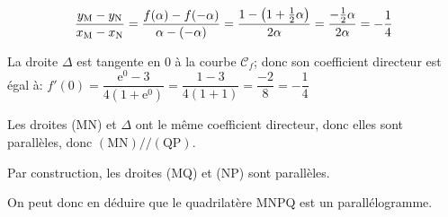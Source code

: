 \documentclass[10pt]{article}
\providecommand{\e}{{\mathrm{e}}}
\begin{document}
\begin{enumerate}
\begin{enumerate}
\[\dfrac{y_{\text M} - y_{\text N}}{x_{\text M} - x_{\text N}}
= \dfrac{f(\alpha) - f(-\alpha)}{\alpha-(-\alpha)}
= \dfrac{1-\left (1+\frac{1}{2}\alpha\right )}{2\alpha}
= \dfrac{-\frac{1}{2}\alpha}{2\alpha}
= -\dfrac{1}{4}\]

La droite $\Delta$ est tangente en 0 à la courbe $\mathcal{C}_f$; donc son coefficient directeur est égal à:
$f'(0)=\dfrac{\e^{0}-3}{4\left (1+\e^{0}\right )}
= \dfrac{1-3}{4\left (1+1\right )}
= \dfrac{-2}{8}
= -\dfrac{1}{4}$

Les droites (MN) et $\Delta$ ont le même coefficient directeur, donc elles sont parallèles, donc $(\text{MN}) /\!/ (\text{QP})$.

Par construction, les droites (MQ) et (NP) sont parallèles.

On peut donc en déduire que le quadrilatère MNPQ est un parallélogramme.
	\end{enumerate}
\end{enumerate}
\end{document}

